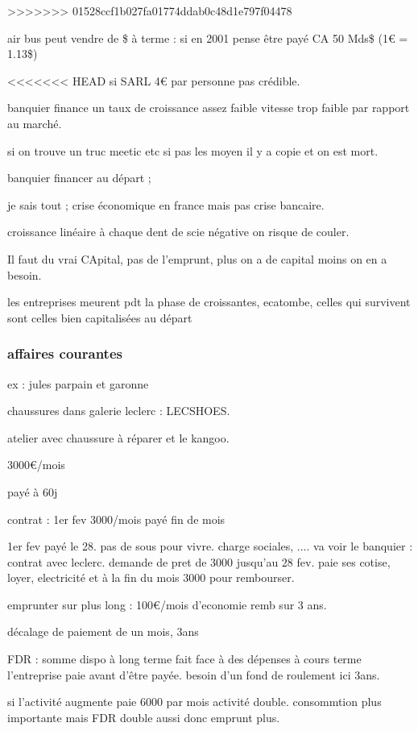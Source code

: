 \documentclass[a4paper,12pt]{article}
\begin{document}
>>>>>>> 01528ccf1b027fa01774ddab0c48d1e797f04478

air bus peut vendre de \$ à terme :
si en 2001 pense être payé CA 50 Mds\$  (1€ = 1.13\$)

<<<<<<< HEAD
si SARL 4€ par personne pas crédible. 
 
banquier finance un taux de croissance assez faible vitesse trop faible par rapport au marché.

si on trouve un truc meetic etc si pas les moyen il y a copie et on est mort.

banquier financer au départ ; 

je sais tout ; 
crise économique en france mais pas crise bancaire.

croissance linéaire à chaque dent de scie négative on risque de couler.

Il faut du vrai CApital, pas de l'emprunt, plus on a de capital moins on en a besoin.

les entreprises meurent pdt la phase de croissantes, ecatombe, 
celles qui survivent sont celles bien capitalisées au départ


\subsubsection{affaires courantes}

ex : jules parpain et garonne

chaussures dans galerie leclerc : LECSHOES.

atelier avec chaussure à réparer et le kangoo.

3000€/mois

payé à 60j

contrat : 1er fev 3000/mois payé fin de mois

1er fev payé le 28. pas de sous pour vivre.
charge sociales, ....
va voir le banquier : contrat avec leclerc.
demande de pret de 3000 jusqu'au 28 fev.
paie ses cotise, loyer, electricité et à la fin du mois
3000 pour rembourser.

emprunter sur plus long : 100€/mois d'economie remb sur 3 ans.

décalage de paiement de un mois, 3ans

FDR : somme dispo à long terme fait face à des dépenses à cours terme
l'entreprise paie avant d'être payée. besoin d'un fond de roulement ici 3ans.


si l'activité augmente paie 6000 par mois activité double.
consommtion plus importante mais FDR double aussi donc emprunt plus.
\end{document}
